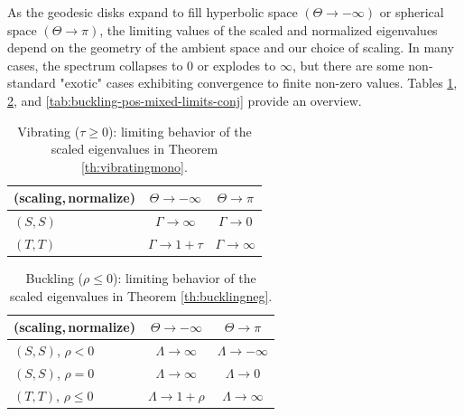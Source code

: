 \documentclass[11pt]{amsart}
\theoremstyle{definition}
\numberwithin{equation}{section}
\begin{document}
As the geodesic disks expand to fill hyperbolic space $(\Theta \to -\infty)$ or spherical space $(\Theta \to \pi)$, the limiting values of the scaled and normalized eigenvalues depend on the geometry of the ambient space and our choice of scaling. In many cases, the spectrum collapses to 0 or explodes to $\infty$, but there are some non-standard "exotic" cases exhibiting convergence to finite non-zero values. Tables \ref{tab:vibrating-limits-conj}, \ref{tab:buckling-neg-limits-conj}, and \ref{tab:buckling-pos-mixed-limits-conj} provide an overview.


\begin{table}[ht]
  \centering
  \begin{tabular}{@{}lcc@{}}
    \toprule
    (scaling,\,normalize) & $\Theta\to-\infty$ & $\Theta\to\pi$ \\
    \midrule
    $(S,S)$ & $\Gamma \to \infty$ & $\Gamma \to 0$ \\
    $(T,T)$ & $\Gamma \to 1+\tau$ & $\Gamma \to \infty$ \\
    \bottomrule
  \end{tabular}
  \caption{Vibrating ($\tau\ge 0$): limiting behavior of the scaled eigenvalues in Theorem \ref{th:vibratingmono}.}
  \label{tab:vibrating-limits-conj}
\end{table}

\begin{table}[ht]
  \centering
  \begin{tabular}{@{}lcc@{}}
    \toprule
    (scaling,\,normalize) & $\Theta\to-\infty$ & $\Theta\to\pi$ \\
    \midrule
    $(S,S)$, $\rho<0$ & $\Lambda \to \infty$ & $\Lambda \to -\infty$ \\
    $(S,S)$, $\rho=0$ & $\Lambda \to \infty$ & $\Lambda \to 0$ \\
    $(T,T)$, $\rho\leq0$ & $\Lambda \to 1+\rho$ & $\Lambda \to \infty$ \\
    \bottomrule
  \end{tabular}
  \caption{Buckling ($\rho\le 0$): limiting behavior of the scaled eigenvalues in Theorem \ref{th:bucklingneg}.}
  \label{tab:buckling-neg-limits-conj}
\end{table}
\end{document}
